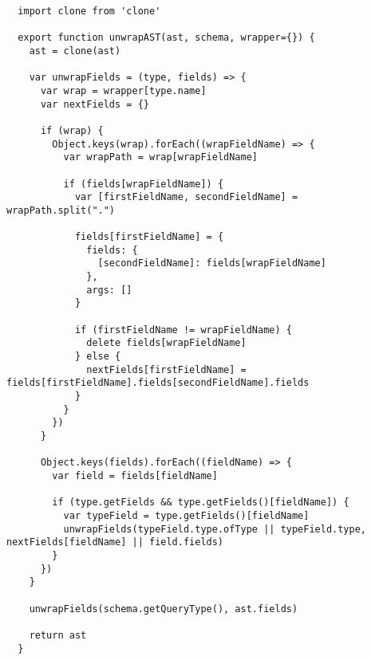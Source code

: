 \begin{verbatim}
  import clone from 'clone'

  export function unwrapAST(ast, schema, wrapper={}) {
    ast = clone(ast)

    var unwrapFields = (type, fields) => {
      var wrap = wrapper[type.name]
      var nextFields = {}

      if (wrap) {
        Object.keys(wrap).forEach((wrapFieldName) => {
          var wrapPath = wrap[wrapFieldName]

          if (fields[wrapFieldName]) {
            var [firstFieldName, secondFieldName] = wrapPath.split(".")

            fields[firstFieldName] = {
              fields: {
                [secondFieldName]: fields[wrapFieldName]
              },
              args: []
            }

            if (firstFieldName != wrapFieldName) {
              delete fields[wrapFieldName]
            } else {
              nextFields[firstFieldName] = fields[firstFieldName].fields[secondFieldName].fields
            }
          }
        })
      }

      Object.keys(fields).forEach((fieldName) => {
        var field = fields[fieldName]

        if (type.getFields && type.getFields()[fieldName]) {
          var typeField = type.getFields()[fieldName]
          unwrapFields(typeField.type.ofType || typeField.type, nextFields[fieldName] || field.fields)
        }
      })
    }

    unwrapFields(schema.getQueryType(), ast.fields)

    return ast
  }
\end{verbatim}
